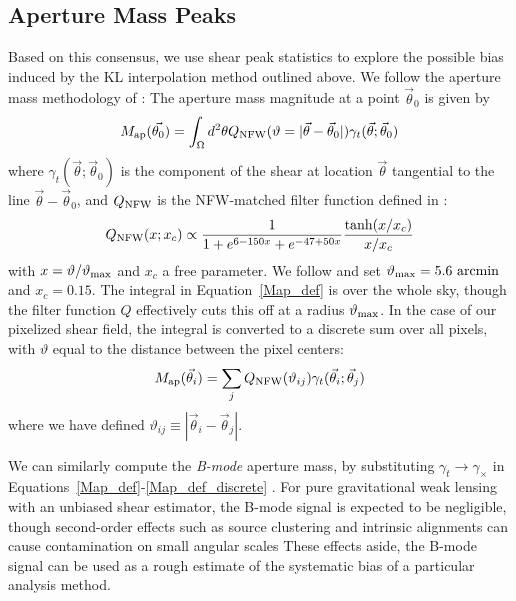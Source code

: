\documentclass[twocolumn]{emulateapj}
\begin{document}
\subsection{Aperture Mass Peaks}
\label{Aperture_Mass}
Based on this consensus, we use shear peak statistics to explore
the possible bias induced by the KL interpolation method outlined above.  
We follow the aperture mass methodology of \citet{Dietrich10}:
The aperture mass magnitude at a point $\vec\theta_0$ is given by
\begin{equation}
  \label{Map_def}
  M_{\rm ap}(\vec{\theta_0})
  = \int_\Omega d^2\theta Q_{\rm NFW}(\vartheta=|\vec\theta-\vec\theta_0|) 
  \gamma_t(\vec\theta;\vec\theta_0)
\end{equation}
where $\gamma_t(\vec\theta;\vec\theta_0)$ is the component of the shear at 
location $\vec\theta$ tangential to the line $\vec\theta-\vec\theta_0$, 
and $Q_{\rm NFW}$ is the 
NFW-matched filter function defined in \citet{Schirmer07}:
\begin{equation}
  Q_{\rm NFW}(x;x_c) \propto \frac{1}{1+e^{6-150x}+e^{-47+50x}}
  \frac{\tanh(x/x_c)}{x/x_c}
\end{equation}
with $x = \vartheta/\vartheta_{\rm max}$ and $x_c$ a free parameter. We follow
\citet{Dietrich10} and set $\vartheta_{\rm max}=5.6\ \mathrm{arcmin}$ and
$x_c=0.15$.  The integral in Equation~\ref{Map_def} is over the whole sky, 
though the filter function $Q$ effectively cuts this off at a radius
$\vartheta_{\rm max}$.  
In the case of our pixelized shear field, the integral is converted to 
a discrete sum over all pixels, with
$\vartheta$ equal to the distance between the pixel centers:
\begin{equation}
  \label{Map_def_discrete}
  M_{\rm ap}(\vec{\theta}_i) 
  = \sum_j Q_{\rm NFW}(\vartheta_{ij}) 
  \gamma_t(\vec{\theta}_i;\vec{\theta}_j) 
\end{equation}
where we have defined $\vartheta_{ij} \equiv |\vec\theta_i-\vec\theta_j|$.

We can similarly compute the \textit{B-mode} aperture mass, by substituting
$\gamma_t \to \gamma_\times$ in Equations~\ref{Map_def}-\ref{Map_def_discrete}
\citep{Crittenden02}.  For pure gravitational
weak lensing with an unbiased shear estimator, the B-mode signal is 
expected to be negligible, though second-order effects such as 
source clustering and intrinsic 
alignments can cause contamination on small angular scales 
\citep{Crittenden02,Schneider02b}
These effects aside, the B-mode signal can be used as a rough estimate of the
systematic bias of a particular analysis method.
\end{document}
